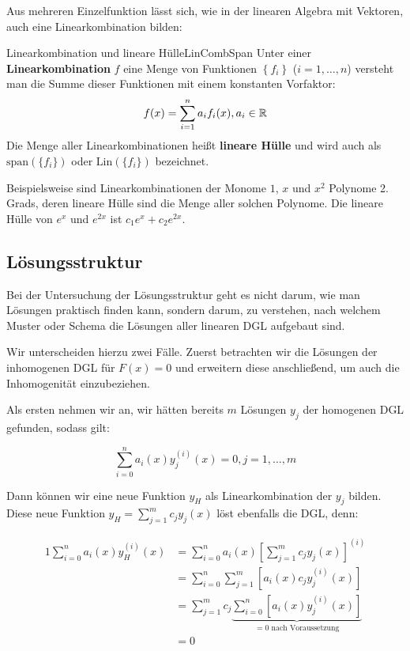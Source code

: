 Aus mehreren Einzelfunktion lässt sich, wie in der linearen Algebra mit Vektoren, auch eine Linearkombination bilden:

\begin{definition}{Linearkombination und lineare Hülle}{LinCombSpan}
    Unter einer \textbf{Linearkombination} $f$ eine Menge von Funktionen $\left\lbrace f_i \right\rbrace$ ($i=1,\dots,n$) versteht man die Summe dieser Funktionen mit einem konstanten Vorfaktor:
    $$
        f(x) = \sum\limits_{i=1}^n a_i f_i(x), a_i \in \mathbb{R}
    $$
    Die Menge aller Linearkombinationen heißt \textbf{lineare Hülle} und wird auch als $\text{span}(\lbrace f_i \rbrace)$ oder $\text{Lin}(\lbrace f_i \rbrace)$ bezeichnet.
\end{definition}

Beispielsweise sind Linearkombinationen der Monome $1$, $x$ und $x^2$ Polynome 2. Grads, deren lineare Hülle sind die Menge aller solchen Polynome. Die lineare Hülle von $e^x$ und $e^{2x}$ ist $c_1 e^x + c_2 e^{2x}$.

\subsection{Lösungsstruktur}

Bei der Untersuchung der Lösungsstruktur geht es nicht darum, wie man Lösungen praktisch finden kann, sondern darum, zu verstehen, nach welchem Muster oder Schema die Lösungen aller linearen DGL aufgebaut sind.

Wir unterscheiden hierzu zwei Fälle. Zuerst betrachten wir die Lösungen der inhomogenen DGL für $F(x) = 0$ und erweitern diese anschließend, um auch die Inhomogenität einzubeziehen.

Als ersten nehmen wir an, wir hätten bereits $m$ Lösungen $y_j$ der homogenen DGL gefunden, sodass gilt:

$$
    \sum\limits_{i=0}^n a_i(x) y_j^{(i)}(x) = 0, j = 1,\dots,m
$$

Dann können wir eine neue Funktion $y_H$ als Linearkombination der $y_j$ bilden. Diese neue Funktion $y_H = \sum\limits_{j=1}^m c_j y_j(x)$ löst ebenfalls die DGL, denn:

\begin{alignat*}{1}
    \sum\limits_{i=0}^n a_i(x) y_H^{(i)}(x) &= \sum\limits_{i=0}^n a_i(x) \left[\sum\limits_{j=1}^m c_j y_j(x)\right]^{(i)} \\
                                            &= \sum\limits_{i=0}^n \sum\limits_{j=1}^m \left[ a_i(x) c_j y_j^{(i)}(x) \right] \\
                                            &= \sum\limits_{j=1}^m c_j \underbrace{\sum\limits_{i=0}^n \left[ a_i(x) y_j^{(i)}(x) \right]}_{=0 \text{ nach Voraussetzung}} \\
                                            &= 0
\end{alignat*}


